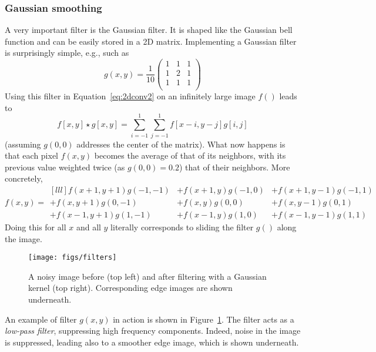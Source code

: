 \subsubsection{Gaussian smoothing}
A very important filter is the Gaussian filter. It is shaped like the Gaussian bell function and can be easily stored in a 2D matrix. Implementing a Gaussian filter is surprisingly simple, e.g., such as
\begin{equation}
g(x,y)=\frac{1}{10}
\left(
\begin{array}{ccc}
1 & 1 & 1\\
1 & 2 & 1\\
1 & 1 & 1\\
\end{array}
\right)
\end{equation}
Using this filter in Equation~\ref{eq:2dconv2} on an infinitely large image $f()$ leads to
\begin{equation}\label{eq:2dconv3}
f[x,y]\star g[x,y]=\sum_{i=-1}^{1}\sum_{j=-1}^{1}f[x-i,y-j]g[i,j]
\end{equation}
(assuming $g(0,0)$ addresses the center of the matrix). What now happens is that each pixel $f(x,y)$ becomes the average of that of its neighbors, with its previous value weighted twice (as $g(0,0)=0.2$) that of their neighbors. More concretely,
\begin{equation}
f(x,y)=
\begin{smallmatrix*}[lll]
f(x+1,y+1)g(-1,-1) &+f(x+1,y)g(-1,0) &+f(x+1,y-1)g(-1,1)\\
+f(x,y+1)g(0,-1) &+f(x,y)g(0,0) &+f(x,y-1)g(0,1)\\
+f(x-1,y+1)g(1,-1) &+f(x-1,y)g(1,0) &+f(x-1,y-1)g(1,1)
\end{smallmatrix*}
\end{equation}
Doing this for all $x$ and all $y$ literally corresponds to sliding the filter $g()$ along the image.

\begin{figure}
    \centering
    \texttt{[image: figs/filters]}
    \caption{A noisy image before (top left) and after filtering with a Gaussian kernel (top right). Corresponding edge images are shown underneath.
    \label{fig:filters}}
\end{figure}

An example of filter $g(x,y)$ in action is shown in Figure~\ref{fig:filters}. The filter acts as a \emph{low-pass filter}, suppressing high frequency components. Indeed, noise in the image is suppressed, leading also to a smoother edge image, which is shown underneath.

